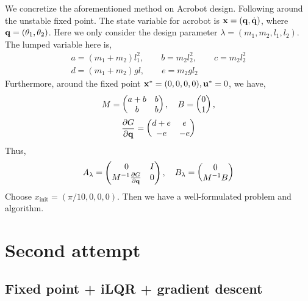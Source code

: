 \documentclass[conference]{IEEEtran}
\begin{document}
We concretize the aforementioned method on Acrobot design. Following \cite{murray1991case} around the unstable fixed point. The state variable for acrobot is $\mathbf{x} = (\mathbf{q},\dot{\mathbf{q}})$, where $\mathbf{q} = (\theta_1,\theta_2)$. Here we only consider the design parameter $\lambda = (m_1,m_2,l_1,l_2)$. The lumped variable here is,
\begin{gather*}
a =  (m_1+m_2)l_1^2,\qquad b=m_2l_2^2,\qquad c=m_2l_2^2\\
d = (m_1+m_2)gl,\qquad  e=m_2gl_2  
\end{gather*}
Furthermore, around the fixed point $\mathbf{x}^* = (0,0,0,0), \mathbf{u}^* = 0$, we have,
\begin{gather*}
M = 
\begin{pmatrix}
a+b&b\\
b&b
\end{pmatrix},\quad
B = 
\begin{pmatrix}
0\\
1
\end{pmatrix},\\
\frac{\partial G}{\partial \mathbf{q}} =
\begin{pmatrix}
d+e&e\\
-e&-e
\end{pmatrix}
\end{gather*}
Thus,
\begin{align*}
A_{\lambda} = 
\begin{pmatrix}
0 & I\\
M^{-1} \frac{\partial G}{\partial \mathbf{q}} & 0
\end{pmatrix},\quad
B_{\lambda} =
\begin{pmatrix}
0 \\
M^{-1}B
\end{pmatrix}
\end{align*}
Choose $x_{\text{init}} = (\pi/10,0,0,0)$. Then we have a well-formulated problem and algorithm.


\section{Second attempt}


\subsection{Fixed point + iLQR + gradient descent}
\label{subsec:ilqr}
\end{document}
